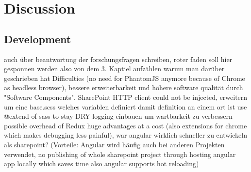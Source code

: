 \documentclass[Bachelor,BIF,english]{twbook}
\begin{document}
\clearpage


\chapter{Discussion}

\section{Development}
auch über beantwortung der forschungsfragen schreiben, 
roter faden soll hier gesponnen werden also von dem 3. Kaptiel aufzählen warum man darüber geschrieben hat
Difficulties (no need for PhantomJS anymore because of Chrome as headless browser), 
bessere erweiterbarkeit und höhere software qualität durch "Software Components", 
SharePoint HTTP client could not be injected, 
erweitern um eine base.scss welches variablen definiert damit definition an einem ort ist
use @extend of sass to stay DRY
logging einbauen um wartbarkeit zu verbessern
possible overhead of Redux huge advantages at a cost (also extensions for chrome which makes debugging less painful),
war angular wirklich schneller zu entwickeln als sharepoint? (Vorteile: Angular wird häufig auch bei anderen Projekten verwendet, no publishing of whole sharepoint project through hosting angular app locally which saves time also angular supports hot reloading)
\end{document}
